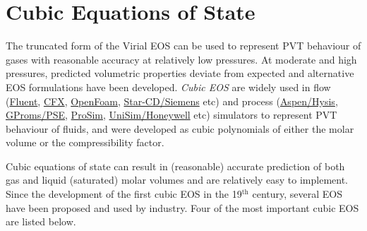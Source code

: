 \begin{subequations}
     \end{subequations}


\section{Cubic Equations of State}\label{Chapter:VolumetricPropertiesPureSubstances:Section:CubicEOS}
     The truncated form of the Virial EOS can be used to represent PVT behaviour of gases with reasonable accuracy at relatively low pressures. At moderate and high pressures, predicted volumetric properties deviate from expected and alternative EOS formulations have been developed. {\it Cubic EOS} are widely used in flow (\eg \href{http://www.ansys.com/Products/Fluids/ANSYS-Fluent}{Fluent}, \href{http://www.ansys.com/en-GB/Solutions/Solutions-by-Application/Fluids}{CFX}, \href{http://www.ansys.com/en-GB/Solutions/Solutions-by-Application/Fluids}{OpenFoam}, \href{https://mdx.plm.automation.siemens.com/star-cd}{Star-CD/Siemens} etc) and process (\href{http://www.openfoam.com/}{Aspen/Hysis}, \href{https://www.psenterprise.com/products/gproms}{GProms/PSE}, \href{http://www.prosim.net/en/index.php}{ProSim}, \href{https://www.honeywellprocess.com/en-US/explore/products/advanced-applications/unisim/Pages/default.aspx}{UniSim/Honeywell} etc) simulators to represent PVT behaviour of fluids, and were developed as cubic polynomials of either the molar volume or the compressibility factor.

     Cubic equations of state can result in (reasonable) accurate prediction of both gas and liquid (saturated) molar volumes and are relatively easy to implement. Since the development of the first cubic EOS in the 19$^{\text{th}}$ century, several EOS have been proposed and used by industry. Four of the most important cubic EOS are listed below.
  

